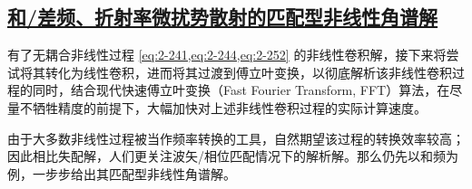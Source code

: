 \subsection{\protect\hyperlink{chap:\thesubsection}{和/差频、折射率微扰势散射的匹配型非线性角谱解}}
\label{和/差频、折射率微扰势散射的匹配型非线性角谱解}

有了无耦合非线性过程 \cref{eq:2-241,eq:2-244,eq:2-252} 的非线性卷积解，接下来将尝试将其转化为线性卷积，进而将其过渡到傅立叶变换，以彻底解析该非线性卷积过程的同时，结合现代快速傅立叶变换（Fast Fourier Transform, FFT）算法，在尽量不牺牲精度的前提下，大幅加快对上述非线性卷积过程的实际计算速度。

由于大多数非线性过程被当作频率转换的工具，自然期望该过程的转换效率较高；因此相比失配解，人们更关注波矢/相位匹配情况下的解析解。那么仍先以和频为例，一步步给出其匹配型非线性角谱解。

